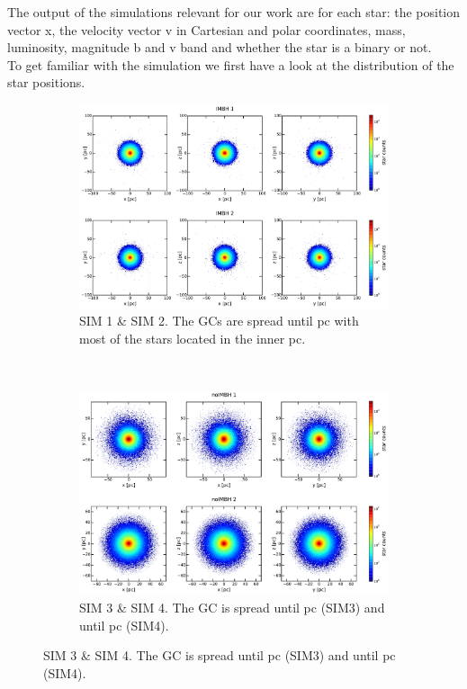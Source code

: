 The output of the simulations relevant for our work are for each star: the position
vector x, the velocity vector v in Cartesian and polar coordinates, mass, luminosity, magnitude b and v band and whether
the star is a binary or not.
\\
To get familiar with the simulation we first have a look at the distribution of the star positions.
\begin{figure}[htbp] 
\centering
\begin{subfigure}{0.9\textwidth}
	\centering
  	\includegraphics[width=\textwidth]{Plots/position_scatter_plot_IMBH.pdf}
  	\caption{SIM 1 \& SIM 2. The \acp{GC} are spread until \unit[100]{pc} with most of the stars located in the inner \unit[40]{pc}.}
 	\label{fig:pos_scat_IMBH}
\end{subfigure}
\\
\begin{subfigure}{0.9\textwidth}
	\centering
  	\includegraphics[width=\textwidth]{Plots/position_scatter_plot_noIMBH.pdf}
  	\caption{SIM 3 \& SIM 4. The \ac{GC} is spread until \unit[90]{pc} (SIM3) and until \unit[60]{pc} (SIM4).}
 	\label{fig:pos_scat_noIMBH}
\end{subfigure}


\end{figure}
